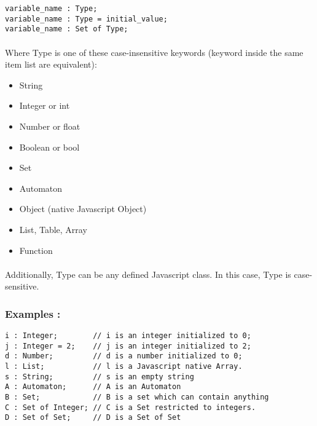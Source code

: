 \documentclass{article}
\begin{document}
\begin{sloppypar}
{\begin{lstlisting}
variable_name : Type;
variable_name : Type = initial_value;
variable_name : Set of Type;
\end{lstlisting}
}

      
      
\paragraph{}
Where Type is one of these case-insensitive keywords (keyword inside the same item list are equivalent):
       
\begin{itemize}
	\item{ String}
	\item{ Integer or int}
	\item{ Number or float}
	\item{ Boolean or bool}
	\item{ Set}
	\item{ Automaton}
	\item{ Object (native Javascript Object)}
	\item{ List, Table, Array}
	\item{ Function}
\end{itemize}

\paragraph{}
Additionally, Type can be any defined Javascript class. In this case, Type is case-sensitive.

      

\subsubsection{ Examples :}

{\begin{lstlisting}
i : Integer;        // i is an integer initialized to 0;
j : Integer = 2;    // j is an integer initialized to 2;
d : Number;         // d is a number initialized to 0;
l : List;           // l is a Javascript native Array.
s : String;         // s is an empty string
A : Automaton;      // A is an Automaton
B : Set;            // B is a set which can contain anything
C : Set of Integer; // C is a Set restricted to integers.
D : Set of Set;     // D is a Set of Set            
\end{lstlisting}
}


\end{sloppypar}
\end{document}
